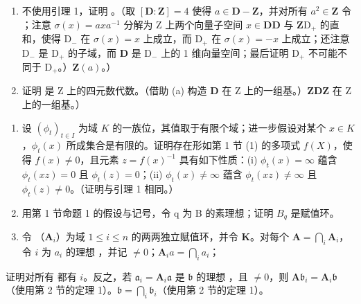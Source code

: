 \begin{enumerate}
\def\labelenumi{(\alph{enumi})}
\item
  不使用引理 1，证明 。（取 \([\mathbf{D}:\mathbf{Z}] = 4\) 使得 \(a\in \mathbf{D} - \mathbf{Z}\)，并对所有 \(a^2\in \mathbf{Z}\) 令 ；注意 \(\sigma (x) = axa^{-1}\) 分解为 Z 上两个向量子空间 \(x\in \mathbf{D}\)\(\mathbf{D}\) 与 \(\mathbf{Z}\)\(\mathrm{D}_{+}\) 的直和，使得 \(\mathrm{D}_{-}\) 在 \(\sigma (x) = x\) 上成立，而 \(\mathrm{D}_{+}\) 在 \(\sigma (x) = -x\) 上成立；还注意 \(\mathrm{D}_{-}\) 是 \(\mathrm{D}_{+}\) 的子域，而 \(\mathbf{D}\) 是 \(\mathrm{D}_{-}\) 上的 1 维向量空间；最后证明 \(\mathrm{D}_{+}\) 不可能不同于 \(\mathrm{D}_{+}\)。）\(\mathbf{Z}(a)\)。）
\item
  证明  是 Z 上的四元数代数。（借助 (a) 构造 \(\mathbf{D}\) 在 Z 上的一组基。）\(\mathbf{Z}\)\(\mathbf{D}\)\(\mathbf{Z}\) 在 Z 上的一组基。）
\end{enumerate}


\begin{enumerate}
\def\labelenumi{\arabic{enumi}.}
\item
  设 \((\phi_{t})_{t\in I}\) 为域 \(K\) 的一族位，其值取于有限个域；进一步假设对某个 \(x\in K\)，\(\phi_t(x)\) 所成集合是有限的。证明存在形如第 1 节 (1) 的多项式 \(f(X)\)，使得 \(f(x)\neq 0\)，且元素 \(z = f(x)^{-1}\) 具有如下性质：(i) \(\phi_t(x) = \infty\) 蕴含 \(\phi_t(xz) = 0\) 且 \(\phi_t(z) = 0\)；(ii) \(\phi_t(x)\neq \infty\) 蕴含 \(\phi_t(xz)\neq \infty\) 且 \(\phi_t(z)\neq 0\)。（证明与引理 1 相同。）
\item
  用第 1 节命题 1 的假设与记号，令 q 为 B 的素理想；证明 \(B_{q}\) 是赋值环。
\item
  令 （\(\mathbf{A}_i\)）为域 \(1 \leqslant i \leqslant n\) 的两两独立赋值环，并令 \(\mathbf{K}\)。对每个 \(\mathbf{A} = \bigcap_{i} \mathbf{A}_i\)，令 \(i\) 为 \(a_i\) 的理想 ，并记 \(\neq 0\)；\(\mathbf{A}_i\)\(a = \bigcap_{i} a_i\)；
\end{enumerate}

证明对所有  都有 \(i\)。反之，若 \(\mathfrak{a}_i = \mathbf{A}_i\mathfrak{a}\) 是 \(\mathfrak{b}\) 的理想 ，且 \(\neq 0\)，则 \(\mathbf{A}\)\(\mathfrak{b}_i = \mathbf{A}_i\mathfrak{b}\)（使用第 2 节的定理 1）。\(\mathfrak{b} = \bigcap_i \mathfrak{b}_i\)（使用第 2 节的定理 1）。


